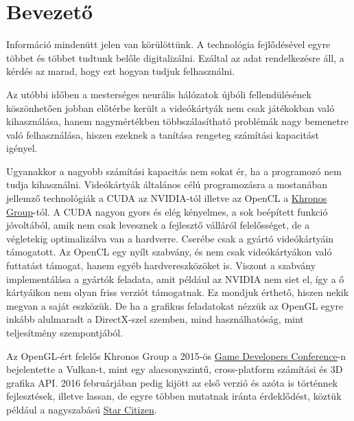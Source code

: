 
\section{Bevezet\H o}
Inform\'aci\'o minden\"utt jelen van k\"or\"ul\"ott\"unk. A technol\'ogia fejl\H od\'es\'evel egyre t\"obbet \'es t\"obbet tudtunk bel\H ole digitaliz\'alni. Ez\'altal az adat rendelkez\'esre \'all, a k\'erd\'es az marad, hogy ezt hogyan tudjuk felhaszn\'alni.

Az ut\'obbi id\H oben a mesters\'eges neur\'alis h\'al\'ozatok \'ujb\'oli fellend\"ul\'es\'enek k\"osz\"onhet\H oen jobban el\H ot\'erbe ker\"ult a vide\'ok\'arty\'ak nem csak j\'at\'ekokban val\'o kihaszn\'al\'asa, hanem nagym\'ert\'ekben t\"obbsz\'alas\'ithat\'o probl\'em\'ak nagy bemenetre val\'o felhaszn\'al\'asa, hiszen ezeknek a tan\'it\'asa rengeteg sz\'am\'it\'asi kapacit\'ast ig\'enyel.

Ugyanakkor a nagyobb sz\'am\'it\'asi kapacit\'as nem sokat \'er, ha a programoz\'o nem tudja kihaszn\'alni.
Vide\'ok\'arty\'ak \'altal\'anos c\'el\'u programoz\'asra a mostan\'aban jellemz\H o technol\'ogi\'ak a CUDA az NVIDIA-t\'ol illetve az OpenCL a \href{https://www.khronos.org/}{Khronos Group}-t\'ol. A CUDA nagyon gyors \'es el\'eg k\'enyelmes, a sok be\'ep\'itett funkci\'o j\'ovolt\'ab\'ol, amik nem csak levesznek a fejleszt\H o v\'all\'ar\'ol felel\H oss\'eget, de a v\'egletekig optimaliz\'alva van a hardverre. Cser\'ebe csak a gy\'art\'o vide\'ok\'arty\'ain t\'amogatott.
Az OpenCL egy ny\'ilt szabv\'any, \'es nem csak vide\'ok\'arty\'akon val\'o futtat\'ast t\'amogat, hanem egy\'eb hardvereszk\"oz\"oket is. Viszont a szabv\'any implement\'al\'asa a gy\'art\'ok feladata, amit p\'eld\'aul az NVIDIA nem siet el, \'igy a \H o k\'arty\'aikon nem olyan friss verzi\'ot t\'amogatnak. Ez mondjuk \'erthet\H o, hiszen nekik megvan a saj\'at eszk\"oz\"uk.
De ha a grafikus feladatokat n\'ezz\"uk az OpenGL egyre ink\'abb alulmaradt a DirectX-szel szemben, mind haszn\'alhat\'os\'ag, mint teljes\'itm\'eny szempontj\'ab\'ol.

Az OpenGL-\'ert felel\H os Khronos Group a 2015-\"os \href{http://www.gdconf.com/}{Game Developers Conference}-n bejelentette a Vulkan-t, mint egy alacsonyszint\H u, cross-platform sz\'am\'it\'asi \'es 3D grafika API.
2016 febru\'arj\'aban pedig kij\"ott az els\H o verzi\'o \'es az\'ota is t\"ort\'ennek fejleszt\'esek, illetve lassan, de egyre t\"obben mutatnak ir\'anta \'erdekl\H od\'est, k\"ozt\"uk p\'eld\'aul a nagyszab\'as\'u \href{https://robertsspaceindustries.com/star-citizen}{Star Citizen}.

